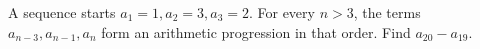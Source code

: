 A sequence starts $a_1=1,a_2=3,a_3=2$. For every $n>3$, the terms $a_{n-3},a_{n-1},a_n$ form an arithmetic progression in that order. Find $a_{20}-a_{19}$.
